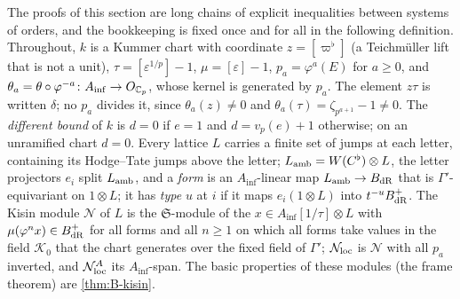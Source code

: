 The proofs of this section are long chains of explicit inequalities between systems of orders, and the bookkeeping is fixed once and for all in the following definition. Throughout, $k$ is a Kummer chart with
coordinate $z=[\varpi^\flat]$ (a Teichm\"uller lift that is not a unit), $\tau=[\varepsilon^{1/p}]-1$, $\mu=[\varepsilon]-1$, $p_a=\varphi^a(E)$ for $a\ge0$, and $\theta_a=\theta\circ\varphi^{-a}\colon A_{\inf}\to O_{\mathbb{C}_p}$, whose kernel is generated by $p_a$. The element $z\tau$ is
written $\delta$; no $p_a$ divides it, since $\theta_a(z)\ne0$ and $\theta_a(\tau)=\zeta_{p^{a+1}}-1\ne0$. The \emph{different bound} of $k$ is $d=0$ if $e=1$ and $d=v_p(e)+1$ otherwise; on an unramified chart $d=0$. Every lattice $L$ carries a finite set of jumps at each letter, containing
its Hodge--Tate jumps above the letter; $L_{\rm amb}=W(C^\flat)\otimes L$, the letter projectors $e_i$ split $L_{\rm amb}$, and a \emph{form} is an $A_{\inf}$-linear map $L_{\rm amb}\to B_{\rm dR}$ that is $\Gamma'$-equivariant on $1\otimes L$; it has \emph{type} $u$ at $i$ if it maps
$e_i(1\otimes L)$ into $t^{-u}B_{\rm dR}^+$. The Kisin module $\mathcal N$ of $L$ is the $\mathfrak S$-module of the $x\in A_{\inf}[1/\tau]\otimes L$ with $\mu(\varphi^nx)\in B_{\rm dR}^+$ for all forms and all $n\ge1$ on which all forms take values in the field $\mathcal K_0$ that the chart generates over the
fixed field of $\Gamma'$; $\mathcal N_{\rm loc}$ is $\mathcal N$ with all $p_a$ inverted, and $\mathcal N^{A}_{\rm loc}$ its $A_{\inf}$-span. The basic properties of these modules (the frame theorem) are \cref{thm:B-kisin}.

